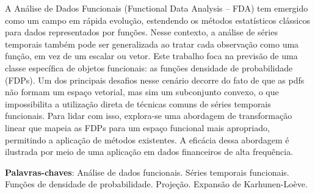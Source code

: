 \documentclass[
	12pt,				%
	oneside,			%
	a4paper,			%
	english,			%
	brazil				%
	]{abntex2ppgsi}
\begin{document}

\setlength{\absparsep}{18pt} %
\begin{resumo}

% 
%
% 
%

A Análise de Dados Funcionais (Functional Data Analysis – FDA) tem emergido como um campo em rápida evolução, estendendo os métodos estatísticos clássicos para dados representados por funções. Nesse contexto, a análise de séries temporais também pode ser generalizada ao tratar cada observação como uma função, em vez de um escalar ou vetor. Este trabalho foca na previsão de uma classe específica de objetos funcionais: as funções densidade de probabilidade (FDPs). Um dos principais desafios nesse cenário decorre do fato de que as pdfs não formam um espaço vetorial, mas sim um subconjunto convexo, o que impossibilita a utilização direta de técnicas comuns de séries temporais funcionais. Para lidar com isso, explora-se uma abordagem de transformação linear que mapeia as FDPs para um espaço funcional mais apropriado, permitindo a aplicação de métodos existentes. A eficácia dessa abordagem é ilustrada por meio de uma aplicação em dados financeiros de alta frequência.

\textbf{Palavras-chaves}: Análise de dados funcionais. Séries temporais funcionais. Funções de densidade de probabilidade. Projeção. Expansão de Karhunen-Loève. 
\end{resumo}
\end{document}
